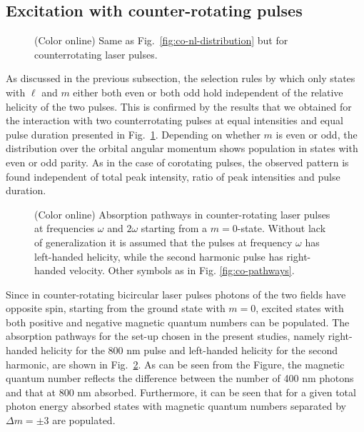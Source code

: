 \subsection{Excitation with counter-rotating pulses}

\begin{figure}[!ht]
\caption{\label{fig:counter-nl-distribution}
(Color online) Same as Fig.\ \ref{fig:co-nl-distribution} but for counterrotating laser pulses.
}
\end{figure}

As discussed in the previous subsection, the selection rules by which only states with $\ell$ and $m$ either both even or both odd hold independent of the relative helicity of the two pulses. This is confirmed by the results that we obtained for the interaction with two counterrotating pulses at equal intensities and equal pulse duration presented in Fig.\ \ref{fig:counter-nl-distribution}. Depending on whether $m$ is even or odd, the distribution over the orbital angular momentum shows population in states with even or odd parity. As in the case of corotating pulses, the observed pattern is found independent of total peak intensity, ratio of peak intensities and pulse duration.


\begin{figure}[!ht]
 \centering
 \caption{\label{fig:counter-pathways}
 (Color online) Absorption pathways in counter-rotating laser pulses at frequencies $\omega$ and $2 \omega$ starting from a $m=0$-state. Without lack of generalization it is assumed that the pulses at frequency $\omega$ has left-handed helicity, while the second harmonic pulse has right-handed velocity. Other symbols as in Fig. \ref{fig:co-pathways}.
 }
 \end{figure}

Since in counter-rotating bicircular laser pulses photons of the two fields have opposite spin, starting from the ground state with $m=0$, excited states with both positive and negative magnetic quantum numbers can be populated. The absorption pathways for the set-up chosen in the present studies, namely right-handed helicity for the 800 nm pulse and left-handed helicity for the second harmonic, are shown in Fig.\ \ref{fig:counter-pathways}. As can be seen from the Figure, the magnetic quantum number reflects the difference between the number of 400 nm photons and that at 800 nm absorbed. Furthermore, it can be seen that for a given total photon energy absorbed states with magnetic quantum numbers separated by $\Delta m = \pm 3$ are populated. 

